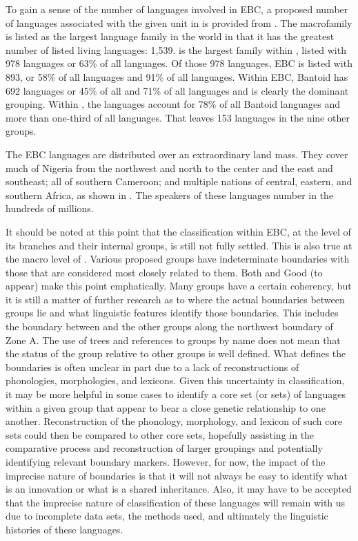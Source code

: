 \documentclass[output=paper]{langsci/langscibook}
\begin{document}
To gain a sense of the number of languages involved in EBC, a proposed number of languages associated with the given unit in  is provided from \citet{SimonsFennig2018}. The  macrofamily is listed as the largest language family in the world in that it has the greatest number of listed living languages: 1,539.  is the largest family within , listed with 978 languages or 63\% of all  languages. Of those 978  languages, EBC is listed with 893, or 58\% of all  languages and 91\% of all  languages. Within EBC, Bantoid has 692 languages or 45\% of all  and 71\% of all  languages and is clearly the dominant grouping. Within , the  languages account for 78\% of all Bantoid languages and more than one-third of all  languages. That leaves 153  languages in the nine other  groups.

The EBC languages are distributed over an extraordinary land mass. They cover much of Nigeria from the northwest and north to the center and the east and southeast; all of southern Cameroon; and multiple nations of central, eastern, and southern Africa, as shown in . The speakers of these languages number in the hundreds of millions. 

It should be noted at this point that the classification within EBC, at the level of its branches and their internal groups, is still not fully settled. This is also true at the macro level of . Various proposed groups have indeterminate boundaries with those that are considered most closely related to them. Both \citet[109-122]{Blench2006} and Good (to appear) make this point emphatically. Many groups have a certain coherency, but it is still a matter of further research as to where the actual boundaries between groups lie and what linguistic features identify those boundaries. This includes the boundary between  and the other  groups along the northwest boundary of  Zone A. The use of trees and references to groups by name does not mean that the status of the group relative to other groups is well defined. What defines the boundaries is often unclear in part due to a lack of reconstructions of phonologies, morphologies, and lexicons. Given this uncertainty in classification, it may be more helpful in some cases to identify a core set (or sets) of languages within a given group that appear to bear a close genetic relationship to one another. Reconstruction of the phonology, morphology, and lexicon of such core sets could then be compared to other core sets, hopefully assisting in the comparative process and reconstruction of larger groupings and potentially identifying relevant boundary markers. However, for now, the impact of the imprecise nature of boundaries is that it will not always be easy to identify what is an innovation or what is a shared inheritance. Also, it may have to be accepted that the imprecise nature of classification of these languages will remain with us due to incomplete data sets, the methods used, and ultimately the linguistic histories of these languages.  
\end{document}
